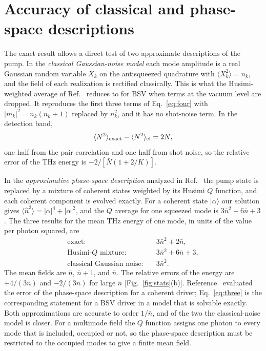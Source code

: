\documentclass[aps,pra,reprint,superscriptaddress,amsmath,amssymb,floatfix]{revtex4-2}
\newcommand{\nbar}{\bar n}
\newcommand{\Nbar}{\bar N}
\begin{document}
\section{Accuracy of classical and phase-space descriptions}
\label{sec:accuracy}

The exact result allows a direct test of two approximate descriptions of the
pump. In the \emph{classical Gaussian-noise model} each mode amplitude is a
real Gaussian random variable $X_k$ on the antisqueezed quadrature with
$\langle X_k^2\rangle=\nbar_k$, and the field of each realization is rectified
classically. This is what the Husimi-weighted average of
Ref.~\cite{gorlach2023} reduces to for BSV when terms at the vacuum level are
dropped. It reproduces the first three terms of Eq.~\eqref{eq:four} with
$|m_k|^2=\nbar_k(\nbar_k+1)$ replaced by $\nbar_k^2$, and it has no shot-noise
term. In the detection band,
\begin{equation}
\langle N^2\rangle_{\rm exact}-\langle N^2\rangle_{\rm cl}=2\Nbar ,
\end{equation}
one half from the pair correlation and one half from shot noise, so the
relative error of the THz energy is $-2/[\Nbar(1+2/K)]$.

In the \emph{approximative phase-space description} analyzed in
Ref.~\cite{gothelf2026} the pump state is replaced by a mixture of coherent
states weighted by its Husimi $Q$ function, and each coherent component is
evolved exactly. For a coherent state $|\alpha\rangle$ our solution gives
$\langle\hat n^2\rangle=|\alpha|^4+|\alpha|^2$, and the $Q$ average for one
squeezed mode is $3\nbar^2+6\nbar+3$. The three results for the mean THz
energy of one mode, in units of the value per photon squared, are
\begin{align}
\text{exact:}\quad&3\nbar^2+2\nbar,\nonumber\\
\text{Husimi-$Q$ mixture:}\quad&3\nbar^2+6\nbar+3,\nonumber\\
\text{classical Gaussian noise:}\quad&3\nbar^2 .
\label{eq:three}
\end{align}
The mean fields are $\nbar$, $\nbar+1$, and $\nbar$. The relative errors of
the energy are $+4/(3\nbar)$ and $-2/(3\nbar)$ for large $\nbar$
[Fig.~\ref{fig:stats}(b)]. Reference~\cite{gothelf2026} evaluated the error of
the phase-space description for a coherent driver; Eq.~\eqref{eq:three} is the
corresponding statement for a BSV driver in a model that is solvable
exactly. Both approximations are accurate to order $1/\nbar$, and of the two
the classical-noise model is closer. For a multimode field the $Q$ function
assigns one photon to every mode that is included, occupied or not, so the
phase-space description must be restricted to the occupied modes to give a
finite mean field.
\end{document}
